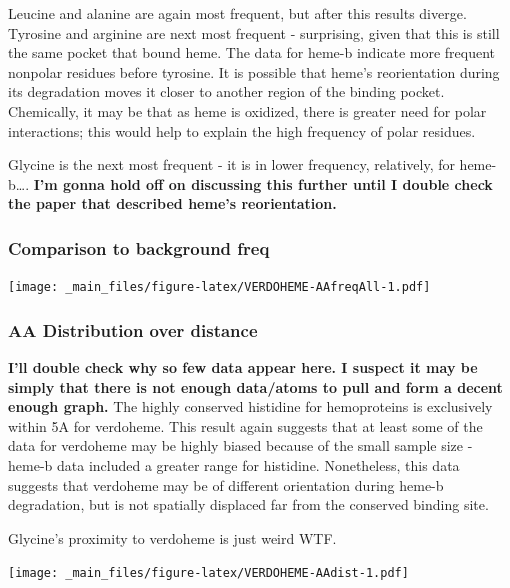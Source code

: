 \documentclass[a4paper, nobind]{templates/ociamthesis}
\let\origfigure\figure
\let\endorigfigure\endfigure
\renewenvironment{figure}[1][2] {
    \expandafter\origfigure\expandafter[H]
} {
    \endorigfigure
}
\begin{document}
Leucine and alanine are again most frequent, but after this results diverge. Tyrosine and arginine are next most frequent - surprising, given that this is still the same pocket that bound heme. The data for heme-b indicate more frequent nonpolar residues before tyrosine. It is possible that heme's reorientation during its degradation moves it closer to another region of the binding pocket. Chemically, it may be that as heme is oxidized, there is greater need for polar interactions; this would help to explain the high frequency of polar residues.

Glycine is the next most frequent - it is in lower frequency, relatively, for heme-b\ldots. \textbf{I'm gonna hold off on discussing this further until I double check the paper that described heme's reorientation.}

\hypertarget{comparison-to-background-freq}{%
\subsubsection{Comparison to background freq}\label{comparison-to-background-freq}}

\begin{figure}
\centering
\texttt{[image: \_main\_files/figure-latex/VERDOHEME-AAfreqAll-1.pdf]}
\caption{\label{fig:VERDOHEME-AAfreqAll}VERDOHEME: AA Frequency of Monomer}
\end{figure}

\hypertarget{aa-distribution-over-distance}{%
\subsubsection{AA Distribution over distance}\label{aa-distribution-over-distance}}

\textbf{I'll double check why so few data appear here. I suspect it may be simply that there is not enough data/atoms to pull and form a decent enough graph.}
The highly conserved histidine for hemoproteins is exclusively within 5A for verdoheme. This result again suggests that at least some of the data for verdoheme may be highly biased because of the small sample size - heme-b data included a greater range for histidine. Nonetheless, this data suggests that verdoheme may be of different orientation during heme-b degradation, but is not spatially displaced far from the conserved binding site.

Glycine's proximity to verdoheme is just weird WTF.

\begin{figure}
\centering
\texttt{[image: \_main\_files/figure-latex/VERDOHEME-AAdist-1.pdf]}
\caption{\label{fig:VERDOHEME-AAdist}VERDOHEME: AA Distances}
\end{figure}
\end{document}
